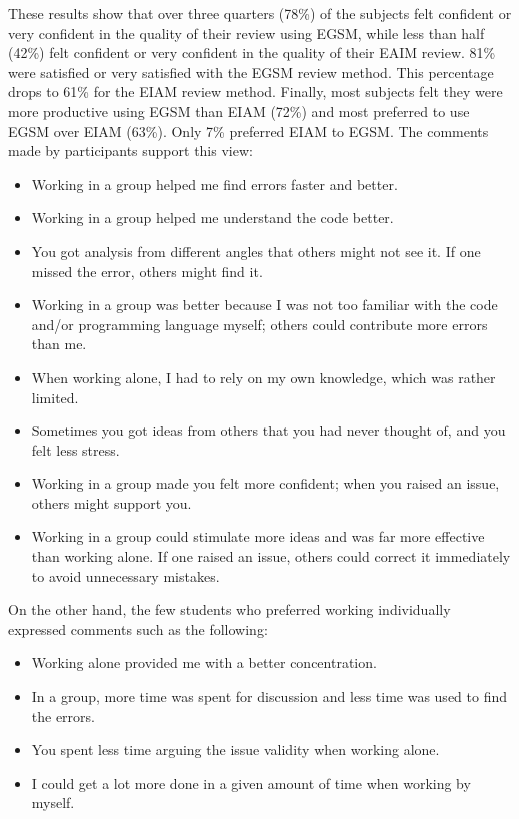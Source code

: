 These results show that over three quarters (78\%) of the subjects felt
confident or very confident in the quality of their review using EGSM,
while less than half (42\%) felt confident or very confident in the quality
of their EAIM review. 81\% were satisfied or very satisfied with the EGSM
review method. This percentage drops to 61\% for the EIAM review method.
Finally, most subjects felt they were more productive using EGSM than EIAM
(72\%) and most preferred to use EGSM over EIAM (63\%). Only 7\% preferred
EIAM to EGSM.  The comments made by participants support this view:

\begin{itemize}
\item Working in a group helped me find errors faster and better.
\item Working in a group helped me understand the code better.
\item You got analysis from  different angles that
others might not see it. If one missed the error, others might find it.  
\item Working in a group was better because I was not too familiar with
the code and/or programming language myself; others could contribute
more errors than me.
\item When working alone, I had to rely on my own knowledge, which was
rather limited.
\item Sometimes you got ideas from others that you had never thought
of, and you felt less stress.
\item Working in a group made you felt more confident; when you raised
an issue, others might support you.
\item Working in a group could stimulate more ideas and was far more
effective than working alone. If one raised an issue, others could
correct it immediately to avoid unnecessary mistakes.
\end{itemize}

On the other hand, the few students who preferred working individually
expressed comments such as the following:

\begin{itemize}
\item Working alone provided me with a better concentration.
\item In a group, more time was spent for discussion and less time was
used to find the errors.
\item You spent less time arguing the issue validity when working alone. 
\item I could get a lot more done in a given amount of time when working
by myself.
\end{itemize}


